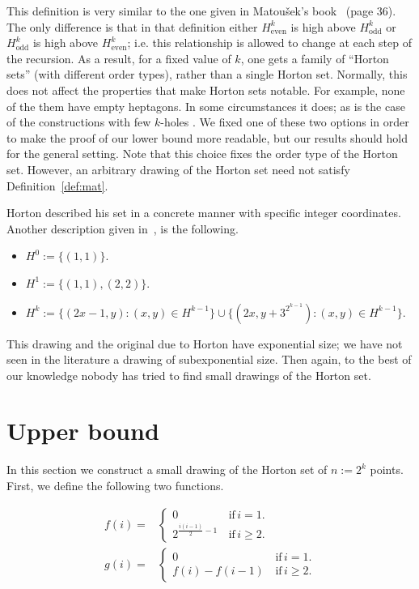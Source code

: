 \documentclass{article}
\begin{document}
This definition is very similar to the one given in Matou{\v{s}}ek's book~\cite{mat} (page 36).
The only difference is that in that definition either
$H_{\textrm{even}}^k$ is high above $H_{\textrm{odd}}^k$ or $H_{\textrm{odd}}^k$ is high above $H_{\textrm{even}}^k$; i.e. this relationship
is allowed to change at each step of the recursion. As a result, for
a fixed value of $k$, one gets a family of 
``Horton sets'' (with different order types), rather than a single Horton set. 
Normally, this does not affect the properties that make Horton sets notable. For example, none of the them
have empty heptagons. In some circumstances it does; as is the case of the constructions 
with few $k$-holes \cite{valtr95,dumi00,valtr04}. We fixed one of 
these two options in order to make the proof of our lower bound more readable, but our results should
hold for the general setting. Note that this choice fixes the order type of the Horton
set. However, an arbitrary drawing of the Horton set need not satisfy Definition~\ref{def:mat}.

Horton described his set in a concrete manner with specific integer 
coordinates. Another description given in~\cite{emptysimplices}, is the following.

\begin{itemize}
  \item $H^0:= \{(1,1)\}$.
  \item $H^1:=\{(1,1),(2,2)\}$.
  \item $H^k:=\{(2x-1,y):(x,y) \in H^{k-1} \} \cup \{(2x,y+3^{2^{k-1}}):(x,y) \in H^{k-1}\}$.
\end{itemize}

This drawing and the original due to Horton have exponential size; we have not seen
in the literature a drawing of subexponential size. Then again, to the
best of our knowledge nobody has tried to find small drawings of the Horton set.


 \section{Upper bound} \label{sec:upper}

In this section we construct a small drawing of 
the Horton set of $n:=2^k$ points. First, we define
the following two functions.

\begin{align*}
f(i)= & \begin{cases}
0 & \,\mbox{if}\, i=1.\\
2^{\frac{i(i-1)}{2}-1} & \,\mbox{if}\, i\geq2.
\end{cases}\\
g(i)= & \begin{cases}
0 & \,\mbox{if}\, i=1.\\
f(i)-f(i-1) & \,\mbox{if}\, i\geq2.
\end{cases}
\end{align*}
\end{document}

